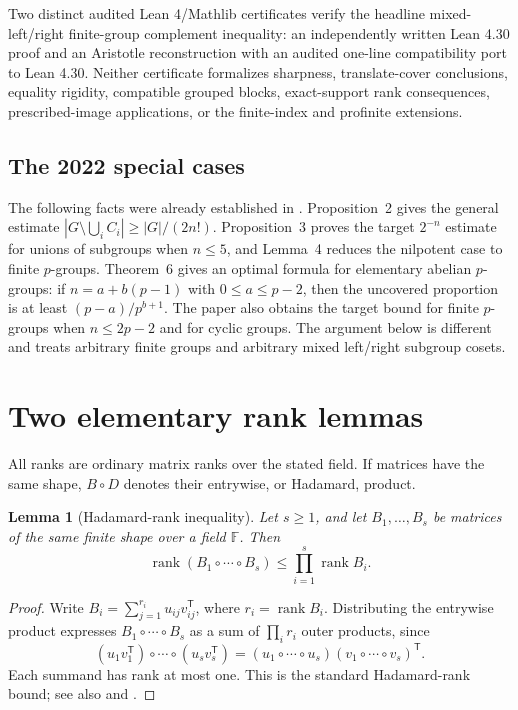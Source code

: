 \documentclass[11pt,a4paper]{amsart}
\newtheorem{lemma}[theorem]{Lemma}
\theoremstyle{definition}
\theoremstyle{remark}
\newcommand{\rank}{\operatorname{rank}}
\newcommand{\Had}{\mathbin{\circ}}
\newcommand{\F}{\mathbb{F}}
\begin{document}
Two distinct audited Lean 4/Mathlib certificates verify the headline
mixed-left/right finite-group complement inequality: an independently written
Lean 4.30 proof and an Aristotle reconstruction with an audited one-line
compatibility port to Lean 4.30.  Neither certificate formalizes sharpness,
translate-cover conclusions, equality rigidity, compatible grouped blocks,
exact-support rank consequences, prescribed-image applications, or the
finite-index and profinite extensions.

\subsection*{The 2022 special cases}
The following facts were already established in
\cite{SambaleTarnauceanu2022}.  Proposition~2 gives the general estimate
$|G\setminus\bigcup_iC_i|\ge |G|/(2n!)$.  Proposition~3 proves the target
$2^{-n}$ estimate for unions of subgroups when $n\le5$, and Lemma~4 reduces the
nilpotent case to finite $p$-groups.  Theorem~6 gives an optimal formula for
elementary abelian $p$-groups: if $n=a+b(p-1)$ with $0\le a\le p-2$, then the
uncovered proportion is at least $(p-a)/p^{b+1}$.  The paper also obtains the
target bound for finite $p$-groups when $n\le2p-2$ and for cyclic groups.  The
argument below is different and treats arbitrary finite groups and arbitrary
mixed left/right subgroup cosets.

\section{Two elementary rank lemmas}

All ranks are ordinary matrix ranks over the stated field.  If matrices have
the same shape, $B\Had D$ denotes their entrywise, or Hadamard, product.

\begin{lemma}[Hadamard-rank inequality]\label{lem:hadamard-rank}
Let $s\ge1$, and let $B_1,\ldots,B_s$ be matrices of the same finite shape over a field $\F$.
Then
\[
  \rank(B_1\Had\cdots\Had B_s)\le\prod_{i=1}^s\rank B_i.
\]
\end{lemma}

\begin{proof}
Write $B_i=\sum_{j=1}^{r_i}u_{ij}v_{ij}^{\mathsf T}$, where
$r_i=\rank B_i$.  Distributing the entrywise product expresses
$B_1\Had\cdots\Had B_s$ as a sum of $\prod_i r_i$ outer products, since
\[
 (u_1v_1^{\mathsf T})\Had\cdots\Had(u_sv_s^{\mathsf T})
 =(u_1\Had\cdots\Had u_s)(v_1\Had\cdots\Had v_s)^{\mathsf T}.
\]
Each summand has rank at most one.  This is the standard Hadamard-rank bound;
see also \cite[Observation~7, p.~587]{Johnson1978} and
\cite[Proposition~2, p.~27]{ArvindJoglekarSrinivasan2009}.
\end{proof}
\end{document}
